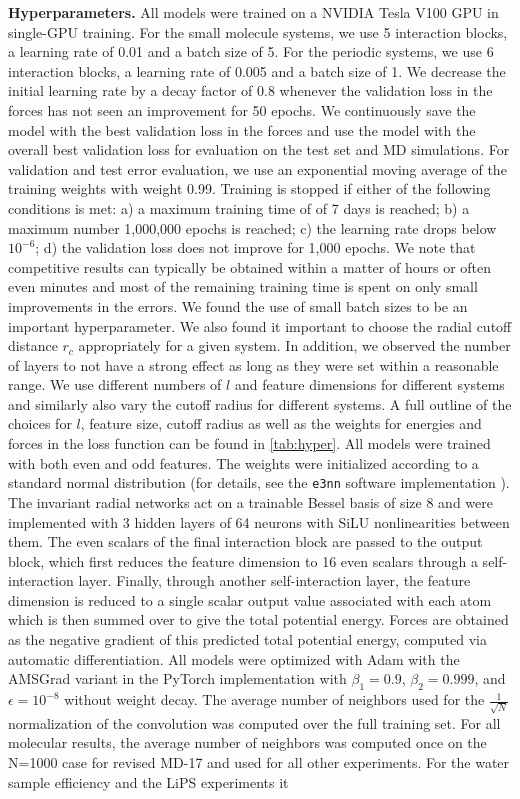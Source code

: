 \documentclass[11pt]{article}
\begin{document}
\textbf{Hyperparameters.} All models were trained on a NVIDIA Tesla V100 GPU in single-GPU training. For the small molecule systems, we use 5 interaction blocks, a learning rate of 0.01 and a batch size of 5. For the periodic systems, we use 6 interaction blocks, a learning rate of 0.005 and a batch size of 1.  We decrease the initial learning rate by a decay factor of 0.8 whenever the validation loss in the forces has not seen an improvement for 50 epochs. We continuously save the model with the best validation loss in the forces and use the model with the overall best validation loss for evaluation on the test set and MD simulations. For validation and test error evaluation, we use an exponential moving average of the training weights with weight 0.99. Training is stopped if either of the following conditions is met: a) a maximum training time of of 7 days is reached; b) a maximum number 1,000,000 epochs is reached; c) the learning rate drops below $10^{-6}$; d) the validation loss does not improve for 1,000 epochs. We note that competitive results can typically be obtained within a matter of hours or often even minutes and most of the remaining training time is spent on only small improvements in the errors. We found the use of small batch sizes to be an important hyperparameter. We also found it important to choose the radial cutoff distance $r_c$ appropriately for a given system. In addition, we observed the number of layers to not have a strong effect as long as they were set within a reasonable range. We use different numbers of $l$ and feature dimensions for different systems and similarly also vary the cutoff radius for different systems. A full outline of the choices for $l$, feature size, cutoff radius as well as the weights for energies and forces in the loss function can be found in \ref{tab:hyper}. All models were trained with both even and odd features. The weights were initialized according to a standard normal distribution (for details, see the \texttt{e3nn} software implementation \cite{mario_geiger_2021_4735637}). The invariant radial networks act on a trainable Bessel basis of size 8 and were implemented with 3 hidden layers of 64 neurons with SiLU nonlinearities between them. The even scalars of the final interaction block are passed to the output block, which  first reduces the feature dimension to 16 even scalars through a self-interaction layer. Finally, through another self-interaction layer, the feature dimension is reduced to a single scalar output value associated with each atom which is then summed over to give the total potential energy. Forces are obtained as the negative gradient of this predicted total potential energy, computed via automatic differentiation. All models were optimized with Adam with the AMSGrad variant in the PyTorch implementation \cite{kingma2014adam, loshchilov2017decoupled, reddi2019convergence} with $\beta_1=0.9$, $\beta_2=0.999$, and $\epsilon=10^{-8}$ without weight decay. The average number of neighbors used for the $\frac{1}{\sqrt{N}}$ normalization of the convolution was computed over the full training set. For all molecular results, the average number of neighbors was computed once on the N=1000 case for revised MD-17 and used for all other experiments. For the water sample efficiency and the LiPS experiments it 
\end{document}
